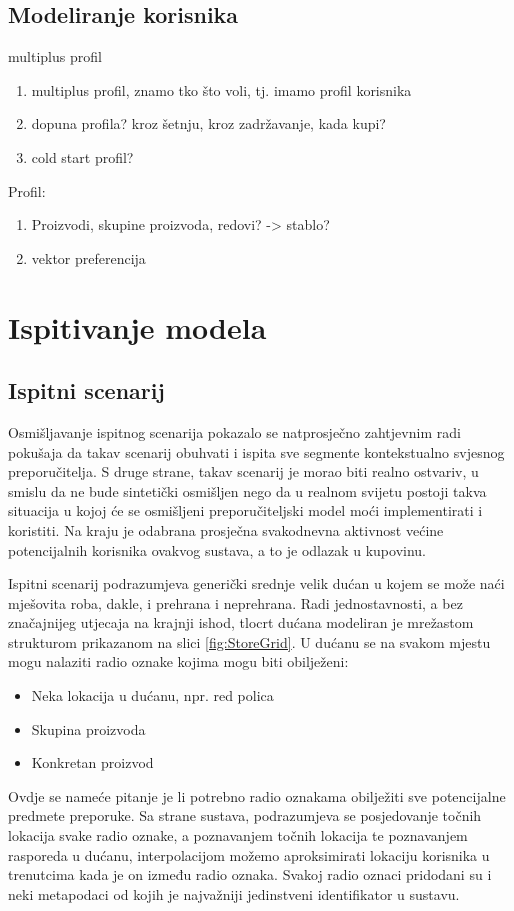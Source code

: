 \documentclass[times, utf8, diplomski, numeric]{fer}
\begin{document}
\section{Modeliranje korisnika}
multiplus profil

\begin{enumerate}
  \item multiplus profil, znamo tko što voli, tj. imamo profil korisnika
  \item dopuna profila? kroz šetnju, kroz zadržavanje, kada kupi?
  \item cold start profil?
\end{enumerate}

Profil:
\begin{enumerate}
  \item Proizvodi, skupine proizvoda, redovi? -> stablo?
  \item vektor preferencija
\end{enumerate}

\chapter{Ispitivanje modela}
\section{Ispitni scenarij}
Osmišljavanje ispitnog scenarija pokazalo se natprosječno zahtjevnim radi
pokušaja da takav scenarij obuhvati i ispita sve segmente kontekstualno svjesnog
preporučitelja. S druge strane, takav scenarij je morao biti realno
ostvariv, u smislu da ne bude sintetički osmišljen nego da u realnom
svijetu postoji takva situacija u kojoj će se osmišljeni preporučiteljski
model moći implementirati i koristiti. Na kraju je odabrana prosječna
svakodnevna aktivnost većine potencijalnih korisnika ovakvog sustava, a to je
odlazak u kupovinu.

Ispitni scenarij podrazumjeva generički srednje velik dućan u kojem se
može naći mješovita roba, dakle, i prehrana i neprehrana. Radi jednostavnosti, a
bez značajnijeg utjecaja na krajnji ishod, tlocrt dućana modeliran je mrežastom
strukturom prikazanom na slici \ref{fig:StoreGrid}. U dućanu se na svakom mjestu
mogu nalaziti radio oznake  kojima mogu biti obilježeni:
\begin{itemize}
  \item Neka lokacija u dućanu, npr. red polica
  \item Skupina proizvoda
  \item Konkretan proizvod
\end{itemize}
Ovdje se nameće pitanje je li potrebno radio oznakama obilježiti sve
potencijalne predmete preporuke. Sa strane sustava, podrazumjeva se
posjedovanje točnih lokacija svake radio oznake, a poznavanjem točnih lokacija
te poznavanjem rasporeda u dućanu, interpolacijom možemo aproksimirati lokaciju
korisnika u trenutcima kada je on između radio oznaka. Svakoj radio oznaci
pridodani su i neki metapodaci od kojih je najvažniji jedinstveni identifikator
u sustavu.
\end{document}
